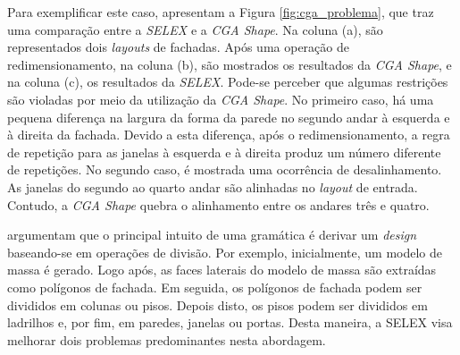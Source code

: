 Para exemplificar este caso,  apresentam a Figura \ref{fig:cga_problema}, que traz uma comparação entre a \textit{SELEX} e a \textit{CGA Shape}. Na coluna (a), são representados dois \textit{layouts} de fachadas. Após uma operação de redimensionamento, na coluna (b), são mostrados os resultados da \textit{CGA Shape}, e na coluna (c), os resultados da \textit{SELEX}. Pode-se perceber que algumas restrições são violadas por meio da utilização da \textit{CGA Shape}. No primeiro caso, há uma pequena diferença na largura da forma da parede no segundo andar à esquerda e à direita da fachada. Devido a esta diferença, após o redimensionamento, a regra de repetição para as janelas à esquerda e à direita produz um número diferente de repetições. No segundo caso, é mostrada uma ocorrência de desalinhamento. As janelas do segundo ao quarto andar são alinhadas no \textit{layout} de entrada. Contudo, a \textit{CGA Shape} quebra o alinhamento entre os andares três e quatro.

\begin{figure}[h!]
	\centering
	\captionsetup{width=14cm}
	{}
\end{figure}

 argumentam que o principal intuito de uma gramática é derivar um \textit{design} baseando-se em operações de divisão. Por exemplo, inicialmente, um modelo de massa é gerado. Logo após, as faces laterais do modelo de massa são extraídas como polígonos de fachada. Em seguida, os polígonos de fachada podem ser divididos em colunas ou pisos. Depois disto, os pisos podem ser divididos em ladrilhos e, por fim, em paredes, janelas ou portas. Desta maneira, a \gls{SELEX} visa melhorar dois problemas predominantes nesta abordagem.

